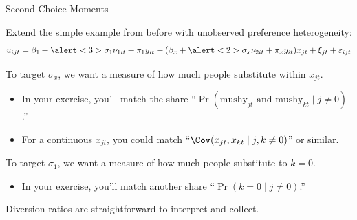 \documentclass[aspectratio=169,t,11pt,table]{beamer}
\begin{document}
\begin{frame}{Second Choice Moments}
    \begin{wideitemize}
        \item Extend the simple example from before with unobserved preference heterogeneity:
        \begin{equation*}
            u_{ijt} = \beta_1 + \alert<3>{\sigma_1} \nu_{1it} + \pi_1 y_{it} + (\beta_x + \alert<2>{\sigma_x} \nu_{2it} + \pi_x y_{it}) x_{jt} + \xi_{jt} + \varepsilon_{ijt} 
        \end{equation*}
        \vspace{-1.5\baselineskip}
        \pause
        \item To target \alert<2>{$\sigma_x$}, we want a measure of how much people substitute within $x_{jt}$.
        \begin{itemize}
            \item In your exercise, you'll match the share ``$\Pr(\text{mushy}_{jt} \text{ and } \text{mushy}_{kt} \mid j \neq 0)$.''
            \item For a continuous $x_{jt}$, you could match ``$\Cov(x_{jt}, x_{kt} \mid j, k \neq 0)$'' or similar.
        \end{itemize}
        \pause
        \item To target \alert<3>{$\sigma_1$}, we want a measure of how much people substitute to $k = 0$.
        \begin{itemize}
            \item In your exercise, you'll match another share ``$\Pr(k = 0 \mid j \neq 0)$.''
        \end{itemize}
        \pause
        \item \alert{Diversion ratios} are straightforward to interpret and collect.
    \end{wideitemize}
\end{frame}
\end{document}
